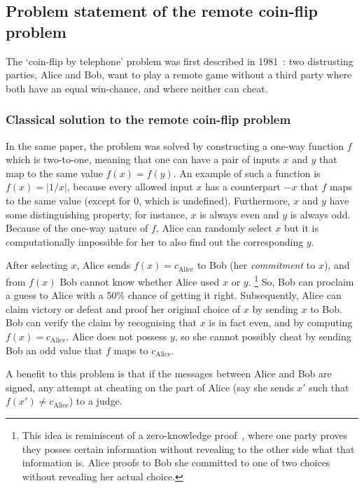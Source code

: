 \documentclass[oneside,a4paper]{article}
\begin{document}

\subsection{Problem statement of the remote coin-flip problem}
The `coin-flip by telephone' problem was first described in 1981~\cite{blum1981coin}: two distrusting parties, Alice and Bob, want to play a remote game without a third party where both have an equal win-chance, and where neither can cheat.

\subsubsection{Classical solution to the remote coin-flip problem}
In the same paper, the problem was solved by constructing a one-way function $f$ which is two-to-one, meaning that one can have a pair of inputs $x$ and $y$ that map to the same value $f(x)=f(y)$.
An example of such a function is $f(x) =|1/x|$, because every allowed input $x$ has a counterpart $-x$ that $f$ maps to the same value (except for $0$, which is undefined).
Furthermore, $x$ and $y$ have some distinguishing property, for instance, $x$ is always even and $y$ is always odd. Because of the one-way nature of $f$, Alice can randomly select $x$ but it is computationally impossible for her to also find out the corresponding $y$.

After selecting $x$, Alice sends $f(x)=c_{\text{Alice}}$ to Bob (her \textit{commitment} to $x$), and from $f(x)$ Bob cannot know whether Alice used $x$ or $y$.
\footnote{
    This idea is reminiscent of a zero-knowledge proof~\cite{goldwasser1989knowledge}, where one party proves they posses certain information without revealing to the other side what that information is.
    Alice proofs to Bob she committed to one of two choices without revealing her actual choice.
}
So, Bob can proclaim a guess to Alice with a 50\% chance of getting it right.
Subsequently, Alice can claim victory or defeat and proof her original choice of $x$ by sending $x$ to Bob.
Bob can verify the claim by recognising that $x$ is in fact even, and by computing $f(x)=c_{\text{Alice}}$.
Alice does not possess $y$, so she cannot possibly cheat by sending Bob an odd value that $f$ maps to $c_{\text{Alice}}$.

A benefit to this problem is that if the messages between Alice and Bob are signed, any attempt at cheating on the part of Alice (say she sends $x'$ such that $f(x') \neq c_{\text{Alice}}$) to a judge.
\end{document}
